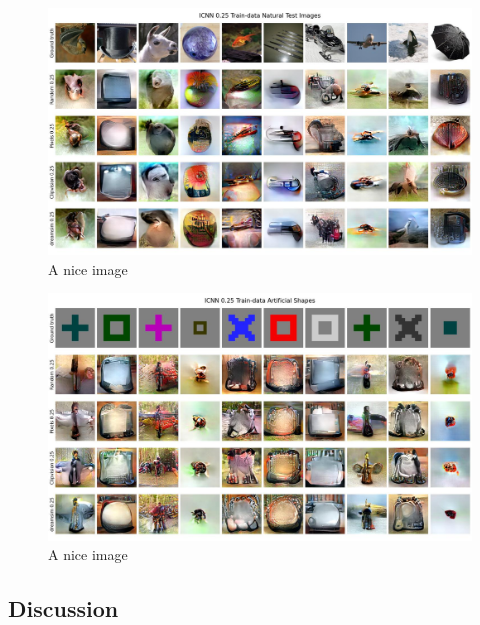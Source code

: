 \begin{figure}[ht]
    \centering
    \includegraphics[width=1\textwidth]{plots/dropout_qual_eval_icnn_test.JPEG}
    \caption{A nice image}\label{fig:dropout_qual_eval_icnn_test}
\end{figure}

\begin{figure}[ht]
    \centering
    \includegraphics[width=1\textwidth]{plots/dropout_qual_eval_icnn_art.JPEG}
    \caption{A nice image}\label{fig:dropout_qual_eval_icnn_art}
\end{figure}

\subsection{Discussion}
